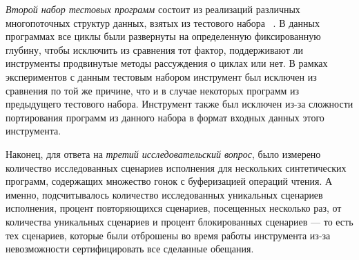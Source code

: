 \textit{Второй набор тестовых программ} состоит из 
реализаций различных многопоточных структур данных, 
взятых из тестового набора \CDSChecker~\cite{Norris-Demsky:OOPSLA2013}. 
В данных программах все циклы были развернуты 
на определенную фиксированную глубину, чтобы исключить из сравнения тот фактор, 
поддерживают ли инструменты продвинутые методы рассуждения о циклах или нет. 
В рамках экспериментов с данным тестовым набором инструмент \Nidhugg 
был исключен из сравнения по той же причине, что 
и в случае некоторых программ из предыдущего тестового набора. 
Инструмент \rmem также был исключен из-за сложности портирования 
программ из данного набора в формат входных данных этого инструмента.



Наконец, для ответа на \emph{третий исследовательский вопрос}, 
было измерено количество исследованных \wmc 
сценариев исполнения для нескольких синтетических программ, 
содержащих множество гонок с буферизацией операций чтения. 
А именно, подсчитывалось количество исследованных уникальных сценариев исполнения,
процент повторяющихся сценариев, посещенных \wmc несколько раз, 
от количества уникальных сценариев и процент блокированных 
сценариев --- то есть тех сценариев, которые 
были отброшены во время работы инструмента 
из-за невозможности сертифицировать все сделанные обещания.

